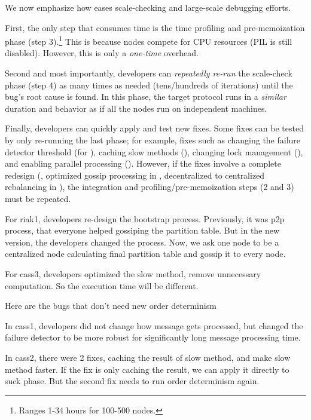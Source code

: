 We now emphasize how \sck eases
scale-checking and large-scale debugging efforts.  

First, the only step that consumes time is the time
profiling and pre-memoization phase (step 3).\footnote{Ranges
1-34 hours for 100-500 nodes.}  This is because nodes
compete for CPU resources (PIL is still disabled).  However, this is only
a {\em one-time} overhead.
%

Second and most importantly, developers can {\em repeatedly re-run} the
scale-check phase (step 4) as many times as needed (tens/hundreds of
iterations) until the bug's root cause is found.  In this phase, the
target protocol runs in a {\em similar} duration and behavior as if all
the nodes run on independent machines.

%
Finally, developers can quickly apply and test new fixes.
%
Some fixes can be tested by only re-running the last phase; for example,
fixes such as
%
changing the failure detector \phi threshold (for \caone),
%
caching slow methods (\catwo),
%
changing lock management (\cafour), and
%
enabling parallel processing (\voldone).
%
%
However, if the fixes involve a complete redesign (\eg, optimized gossip
processing in \catri, decentralized to centralized rebalancing in
\riakone), the integration and profiling/pre-memoization steps (2 and 3)
must be repeated.










For riak1, developers re-design the bootstrap process.  Previously, it was
p2p process, that everyone helped gossiping the partition table.  But in
the new version, the developers changed the process.  Now, we ask one node
to be a centralized node calculating final partition table and gossip it
to every node.

For cass3, developers optimized the slow method, remove unnecessary
computation.  So the execution time will be different.

Here are the bugs that don't need new order determinism

In cass1, developers did not change how message gets processed, but
changed the failure detector to be more robust for significantly long
message processing time.

In cass2, there were 2 fixes, caching the result of slow method, and make
slow method faster.  If the fix is only caching the result, we can apply
it directly to suck phase.  But the second fix needs to run order
determinism again.

